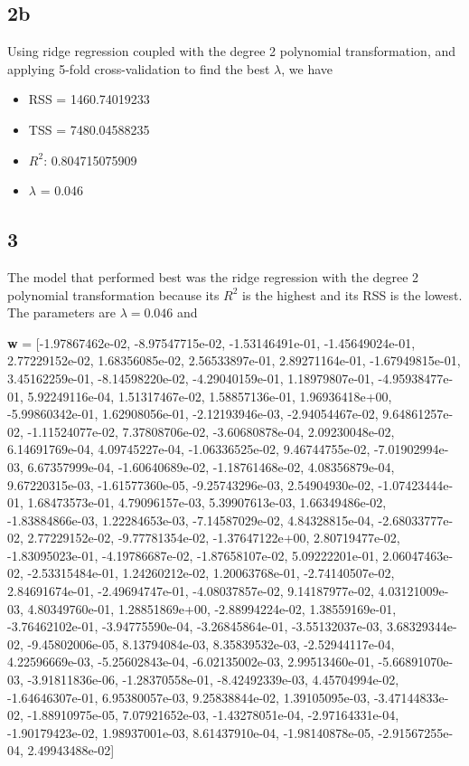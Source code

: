 \documentclass[leqno]{article}
\begin{document}
\subsection*{2b} Using ridge regression coupled with the degree 2 polynomial transformation, and applying 
5-fold cross-validation to find the best $\lambda$, we have
\begin{itemize}
\item RSS = 1460.74019233
\item TSS = 7480.04588235
\item $R^2$: 0.804715075909
\item $\lambda$ = 0.046
\end{itemize}

\subsection*{3} The model that performed best was the ridge regression with the degree 2 polynomial transformation because its 
$R^2$ is the highest and its RSS is the lowest. The parameters are $\lambda = 0.046$ and

\noindent \textbf{w} = [-1.97867462e-02, -8.97547715e-02, -1.53146491e-01, -1.45649024e-01,  2.77229152e-02,  1.68356085e-02,  2.56533897e-01,  2.89271164e-01, -1.67949815e-01,  3.45162259e-01, -8.14598220e-02, -4.29040159e-01,  1.18979807e-01, -4.95938477e-01,  5.92249116e-04,  1.51317467e-02,  1.58857136e-01,  1.96936418e+00, -5.99860342e-01,  1.62908056e-01, -2.12193946e-03, -2.94054467e-02,  9.64861257e-02, -1.11524077e-02,  7.37808706e-02, -3.60680878e-04,  2.09230048e-02,  6.14691769e-04,  4.09745227e-04, -1.06336525e-02,  9.46744755e-02, -7.01902994e-03,  6.67357999e-04, -1.60640689e-02, -1.18761468e-02,  4.08356879e-04,  9.67220315e-03, -1.61577360e-05, -9.25743296e-03,  2.54904930e-02, -1.07423444e-01,  1.68473573e-01,  4.79096157e-03,  5.39907613e-03,  1.66349486e-02, -1.83884866e-03,  1.22284653e-03, -7.14587029e-02,  4.84328815e-04, -2.68033777e-02,  2.77229152e-02, -9.77781354e-02, -1.37647122e+00,  2.80719477e-02, -1.83095023e-01, -4.19786687e-02, -1.87658107e-02,  5.09222201e-01,  2.06047463e-02, -2.53315484e-01,  1.24260212e-02,  1.20063768e-01, -2.74140507e-02,  2.84691674e-01, -2.49694747e-01, -4.08037857e-02,  9.14187977e-02,  4.03121009e-03,  4.80349760e-01,  1.28851869e+00, -2.88994224e-02,  1.38559169e-01, -3.76462102e-01, -3.94775590e-04, -3.26845864e-01, -3.55132037e-03,  3.68329344e-02, -9.45802006e-05,  8.13794084e-03,  8.35839532e-03, -2.52944117e-04,  4.22596669e-03, -5.25602843e-04, -6.02135002e-03,  2.99513460e-01, -5.66891070e-03, -3.91811836e-06, -1.28370558e-01, -8.42492339e-03,  4.45704994e-02, -1.64646307e-01,  6.95380057e-03,  9.25838844e-02,  1.39105095e-03, -3.47144833e-02, -1.88910975e-05,  7.07921652e-03, -1.43278051e-04, -2.97164331e-04, -1.90179423e-02,  1.98937001e-03,  8.61437910e-04, -1.98140878e-05, -2.91567255e-04,  2.49943488e-02]
\end{document}
